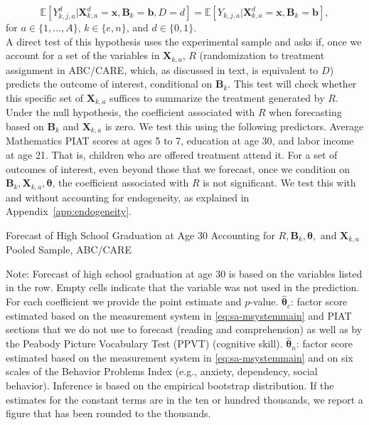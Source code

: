 \begin{equation}\label{eq:invariancetestapp}
\mathbb{E} \left[ Y_{k,j,a}^d | \bm{X}_{k,a}^d  = \bm{x}, \bm{B}_k = \bm{b}, D = d \right] = \mathbb{E} \left[ Y_{k,j,a} | \bm{X}^d_{k,a}  = \bm{x}, \bm{B}_k = \bm{b} \right],
\end{equation}
for $a \in \{1,\dots,A\}$, $k \in \{e,n\}$, and $d \in \{0,1\}$.\\

\noindent A direct test of this hypothesis uses the experimental sample and asks if, once we account for a set of the variables in $\bm{X}_{k,a}$, $R$ (randomization to treatment assignment in ABC/CARE, which, as discussed in text, is equivalent to $D$)  predicts the outcome of interest, conditional on $\bm{B}_k$. This test will check whether this specific set of $\bm{X}_{k,a}$ suffices to summarize the treatment generated by $R$. Under the null hypothesis, the coefficient associated with $R$ when forecasting based on $\bm{B}_k$ and $\bm{X}_{k,a}$ is zero. We test this using the following predictors. Average Mathematics PIAT scores at ages 5 to 7, education at age 30, and labor income at age 21. That is, children who are offered treatment attend it. For a set of outcomes of interest, even beyond those that we forecast, once we condition on $\bm{B}_k, \bm{X}_{k,a}, \bm{\theta}$, the coefficient associated with $R$ is not significant. We test this with and without accounting for endogeneity, as explained in Appendix~\ref{app:endogeneity}.

\begin{table}
\begin{threeparttable}
\caption{Forecast of High School Graduation at Age 30 Accounting for $R, \bm{B}_k, \bm{\theta},$ and $\bm{X}_{k,a}$ Pooled Sample, ABC/CARE}
\label{table:end2}
\centering
\scriptsize

\begin{tablenotes}
\footnotesize
\item Note: Forecast of high school graduation at age 30 is based on the variables listed in the row. Empty cells indicate that the variable was not used in the prediction. For each coefficient we provide the point estimate and $p$-value. $\hat{\bm{\theta}}_{c}$: factor score estimated based on the measurement system in \eqref{eq:sa-msystemmain} and PIAT sections that we do not use to forecast (reading and comprehension) as well as by the Peabody Picture Vocabulary Test (PPVT) (cognitive skill). $\hat{\bm{\theta}}_{n}$: factor score estimated based on the measurement system in \eqref{eq:sa-msystemmain} and on six scales of the Behavior Problems Index (e.g., anxiety, dependency, social behavior). Inference is based on the empirical bootstrap distribution. If the estimates for the constant terms are in the ten or hundred thousands, we report a figure that has been rounded to the thousands.
\end{tablenotes}
\end{threeparttable}
\end{table}

